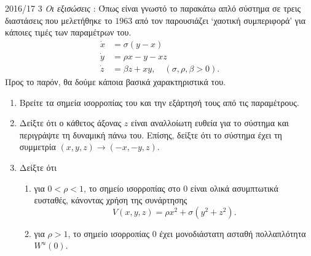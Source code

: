 \begin{exercise}{2016/17 3}
    \emph{Οι εξισώσεις }: Όπως είναι γνωστό το παρακάτω απλό σύστημα
    σε τρεις διαστάσεις που μελετήθηκε το \( 1963 \) από τον 
    παρουσιάζει \enquote*{χαοτική συμπεριφορά} για κάποιες τιμές των παραμέτρων
    του.
    \begin{align*}
        \dot{x} &= \sigma(y - x) \\
        \dot{y} &= \rho x - y - xz \\
        \dot{z} &= \beta z + xy, \quad ( \sigma, \rho, \beta > 0).
    \end{align*}
    Προς το παρόν, θα δούμε κάποια βασικά χαρακτηριστικά του.
    \begin{enumerate}[label= (\alph*)]
        \item Βρείτε τα σημεία ισορροπίας του και την εξάρτησή τους από τις
            παραμέτρους.
        \item Δείξτε ότι ο κάθετος άξονας \( z \) είναι αναλλοίωτη ευθεία για το
            σύστημα και περιγράψτε τη δυναμική πάνω του. Επίσης, δείξτε ότι το
            σύστημα έχει τη συμμετρία \( (x, y, z) \to (-x, -y, z) \).
        \item Δείξτε ότι
            \begin{enumerate}[label= (\roman*)]
                \item για \( 0 < \rho < 1 \), το σημείο ισορροπίας στο \( 0 \)
                    είναι ολικά ασυμπτωτικά ευσταθές, κάνοντας χρήση της
                    συνάρτησης 
                    \begin{equation*}
                        V(x, y, z) = \rho x^2 + \sigma(y^2 + z^2).
                    \end{equation*}
                \item για \( \rho > 1 \), το σημείο ισορροπίας \( 0 \) έχει
                    μονοδιάστατη ασταθή πολλαπλότητα \( W^u(0) \).
            \end{enumerate}
    \end{enumerate}
\end{exercise}
